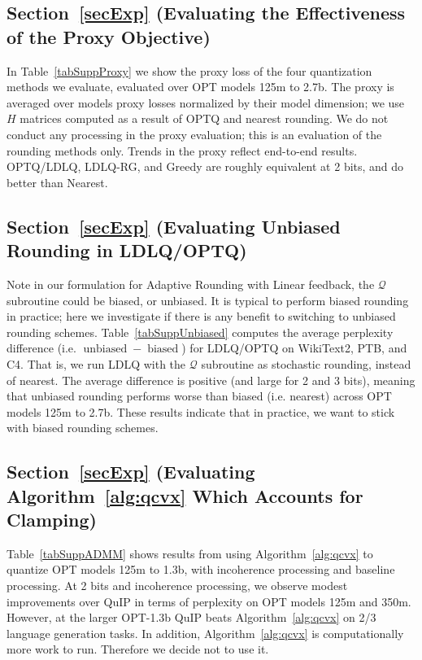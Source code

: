 \subsection{Section~\ref{secExp} (Evaluating the Effectiveness of the Proxy Objective)}

In Table~\ref{tabSuppProxy} we show the proxy loss of the four quantization methods we evaluate, evaluated over OPT models 125m to 2.7b. The proxy is averaged over models proxy losses normalized by their model dimension; we use $H$ matrices computed as a result of OPTQ and nearest rounding. We do not conduct any processing in the proxy evaluation; this is an evaluation of the rounding methods only. Trends in the proxy reflect end-to-end results. OPTQ/LDLQ, LDLQ-RG, and Greedy are roughly equivalent at 2 bits, and do better than Nearest.

\subsection{Section~\ref{secExp} (Evaluating Unbiased Rounding in LDLQ/OPTQ)}

Note in our formulation for Adaptive Rounding with Linear feedback, the $\mathcal{Q}$ subroutine could be biased, or unbiased. It is typical to perform biased rounding in practice; here we investigate if there is any benefit to switching to unbiased rounding schemes.
Table~\ref{tabSuppUnbiased} computes the average perplexity difference (i.e. $\operatorname{unbiased} - \operatorname{biased}$) for LDLQ/OPTQ on WikiText2, PTB, and C4. That is, we run LDLQ with the $\mathcal{Q}$ subroutine as stochastic rounding, instead of nearest. The average difference is positive (and large for 2 and 3 bits), meaning that unbiased rounding performs worse than biased (i.e. nearest) across OPT models 125m to 2.7b. These results indicate that in practice, we want to stick with biased rounding schemes.

\subsection{Section~\ref{secExp} (Evaluating Algorithm~\ref{alg:qcvx} Which Accounts for Clamping)}

Table~\ref{tabSuppADMM} shows results from using Algorithm~\ref{alg:qcvx} to quantize OPT models 125m to 1.3b, with incoherence processing and baseline processing. At 2 bits and incoherence processing, we observe modest improvements over QuIP in terms of perplexity on OPT models 125m and 350m. However, at the larger OPT-1.3b QuIP beats Algorithm~\ref{alg:qcvx} on 2/3 language generation tasks. In addition, Algorithm~\ref{alg:qcvx} is computationally more work to run. Therefore we decide not to use it.

